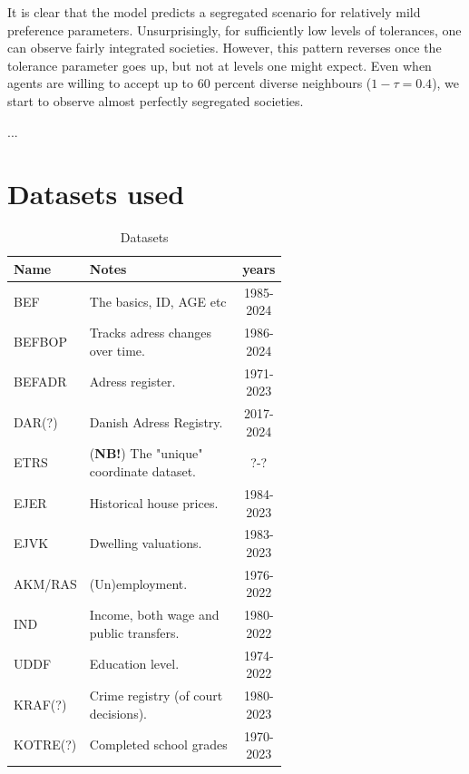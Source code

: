 \documentclass[../main.tex]{subfiles}
\begin{document}
It is clear that the model predicts a segregated scenario for relatively mild preference parameters. Unsurprisingly, for sufficiently low levels of tolerances, one can observe fairly integrated societies. However, this pattern reverses once the tolerance parameter goes up, but not at levels one might expect. Even when agents are willing to accept up to 60 percent diverse neighbours ($1-\tau = 0.4$), we start to observe almost perfectly segregated societies.

...

\section{Datasets used}
\begin{table}[H]
    \centering
    \caption{Datasets}
    \begin{tabular}{l|p{0.6\linewidth}|c}
    \toprule
      Name & Notes & years \\
    \midrule
      BEF           & The basics, ID, AGE etc               & 1985-2024 \\
      BEFBOP        & Tracks adress changes over time. & 1986-2024 \\
      BEFADR        & Adress register. & 1971-2023 \\
      DAR(?)        & Danish Adress Registry. & 2017-2024 \\ 
      ETRS & (\textbf{NB!}) The "unique" coordinate dataset. & ?-?\\
      EJER & Historical house prices. & 1984-2023 \\
      EJVK & Dwelling valuations. & 1983-2023 \\
      AKM/RAS & (Un)employment. & 1976-2022 \\
      IND & Income, both wage and public transfers. & 1980-2022 \\
      UDDF & Education level. & 1974-2022 \\
      \hdashline
      KRAF(?)       & Crime registry (of court decisions). & 1980-2023\\
      KOTRE(?)      & Completed school grades               & 1970-2023 \\
    \bottomrule
    \end{tabular}
\end{table}
\end{document}
